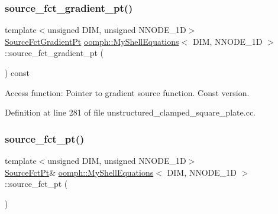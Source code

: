 \subsubsection{\texorpdfstring{source\+\_\+fct\+\_\+gradient\+\_\+pt()}{source\_fct\_gradient\_pt()}\hspace{0.1cm}{\footnotesize\ttfamily [2/2]}}
{\footnotesize\ttfamily template$<$unsigned D\+IM, unsigned N\+N\+O\+D\+E\+\_\+1D$>$ \\
\hyperlink{classoomph_1_1MyShellEquations_a954dcc1b78710f331ed390b716aa07dd}{Source\+Fct\+Gradient\+Pt} \hyperlink{classoomph_1_1MyShellEquations}{oomph\+::\+My\+Shell\+Equations}$<$ D\+IM, N\+N\+O\+D\+E\+\_\+1D $>$\+::source\+\_\+fct\+\_\+gradient\+\_\+pt (\begin{DoxyParamCaption}{ }\end{DoxyParamCaption}) const\hspace{0.3cm}{\ttfamily [inline]}}



Access function\+: Pointer to gradient source function. Const version. 



Definition at line 281 of file unstructured\+\_\+clamped\+\_\+square\+\_\+plate.\+cc.

\mbox{\label{classoomph_1_1MyShellEquations_a8aee1d7092584b9ad7095dfd905f5893}} 
\subsubsection{\texorpdfstring{source\+\_\+fct\+\_\+pt()}{source\_fct\_pt()}\hspace{0.1cm}{\footnotesize\ttfamily [1/2]}}
{\footnotesize\ttfamily template$<$unsigned D\+IM, unsigned N\+N\+O\+D\+E\+\_\+1D$>$ \\
\hyperlink{classoomph_1_1MyShellEquations_a056d2488b6e65787f5c9935a321b7a9b}{Source\+Fct\+Pt}\& \hyperlink{classoomph_1_1MyShellEquations}{oomph\+::\+My\+Shell\+Equations}$<$ D\+IM, N\+N\+O\+D\+E\+\_\+1D $>$\+::source\+\_\+fct\+\_\+pt (\begin{DoxyParamCaption}{ }\end{DoxyParamCaption})\hspace{0.3cm}{\ttfamily [inline]}}



